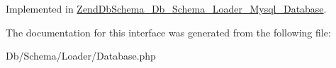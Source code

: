 Implemented in \hyperlink{classZendDbSchema__Db__Schema__Loader__Mysql__Database_a16e134d0a65a88984ad8a066af0829c5}{Zend\-Db\-Schema\-\_\-\-Db\-\_\-\-Schema\-\_\-\-Loader\-\_\-\-Mysql\-\_\-\-Database}.



The documentation for this interface was generated from the following file\-:\begin{DoxyCompactItemize}
\item 
Db/\-Schema/\-Loader/Database.\-php\end{DoxyCompactItemize}
